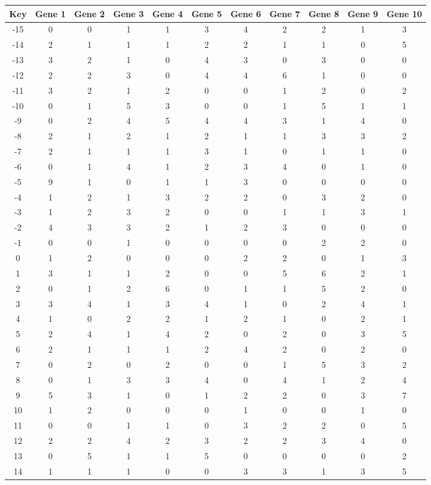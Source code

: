 \begin{tabular}{|c|c|c|c|c|c|c|c|c|c|c|}
\hline
Key & Gene 1 & Gene 2 & Gene 3 & Gene 4 & Gene 5 & Gene 6 & Gene 7 & Gene 8 & Gene 9 & Gene 10 \\
\hline
-15 & 0 & 0 & 1 & 1 & 3 & 4 & 2 & 2 & 1 & 3 \\
-14 & 2 & 1 & 1 & 1 & 2 & 2 & 1 & 1 & 0 & 5 \\
-13 & 3 & 2 & 1 & 0 & 4 & 3 & 0 & 3 & 0 & 0 \\
-12 & 2 & 2 & 3 & 0 & 4 & 4 & 6 & 1 & 0 & 0 \\
-11 & 3 & 2 & 1 & 2 & 0 & 0 & 1 & 2 & 0 & 2 \\
-10 & 0 & 1 & 5 & 3 & 0 & 0 & 1 & 5 & 1 & 1 \\
-9 & 0 & 2 & 4 & 5 & 4 & 4 & 3 & 1 & 4 & 0 \\
-8 & 2 & 1 & 2 & 1 & 2 & 1 & 1 & 3 & 3 & 2 \\
-7 & 2 & 1 & 1 & 1 & 3 & 1 & 0 & 1 & 1 & 0 \\
-6 & 0 & 1 & 4 & 1 & 2 & 3 & 4 & 0 & 1 & 0 \\
-5 & 9 & 1 & 0 & 1 & 1 & 3 & 0 & 0 & 0 & 0 \\
-4 & 1 & 2 & 1 & 3 & 2 & 2 & 0 & 3 & 2 & 0 \\
-3 & 1 & 2 & 3 & 2 & 0 & 0 & 1 & 1 & 3 & 1 \\
-2 & 4 & 3 & 3 & 2 & 1 & 2 & 3 & 0 & 0 & 0 \\
-1 & 0 & 0 & 1 & 0 & 0 & 0 & 0 & 2 & 2 & 0 \\
0 & 1 & 2 & 0 & 0 & 0 & 2 & 2 & 0 & 1 & 3 \\
1 & 3 & 1 & 1 & 2 & 0 & 0 & 5 & 6 & 2 & 1 \\
2 & 0 & 1 & 2 & 6 & 0 & 1 & 1 & 5 & 2 & 0 \\
3 & 3 & 4 & 1 & 3 & 4 & 1 & 0 & 2 & 4 & 1 \\
4 & 1 & 0 & 2 & 2 & 1 & 2 & 1 & 0 & 2 & 1 \\
5 & 2 & 4 & 1 & 4 & 2 & 0 & 2 & 0 & 3 & 5 \\
6 & 2 & 1 & 1 & 1 & 2 & 4 & 2 & 0 & 2 & 0 \\
7 & 0 & 2 & 0 & 2 & 0 & 0 & 1 & 5 & 3 & 2 \\
8 & 0 & 1 & 3 & 3 & 4 & 0 & 4 & 1 & 2 & 4 \\
9 & 5 & 3 & 1 & 0 & 1 & 2 & 2 & 0 & 3 & 7 \\
10 & 1 & 2 & 0 & 0 & 0 & 1 & 0 & 0 & 1 & 0 \\
11 & 0 & 0 & 1 & 1 & 0 & 3 & 2 & 2 & 0 & 5 \\
12 & 2 & 2 & 4 & 2 & 3 & 2 & 2 & 3 & 4 & 0 \\
13 & 0 & 5 & 1 & 1 & 5 & 0 & 0 & 0 & 0 & 2 \\
14 & 1 & 1 & 1 & 0 & 0 & 3 & 3 & 1 & 3 & 5 \\
\hline
\end{tabular}